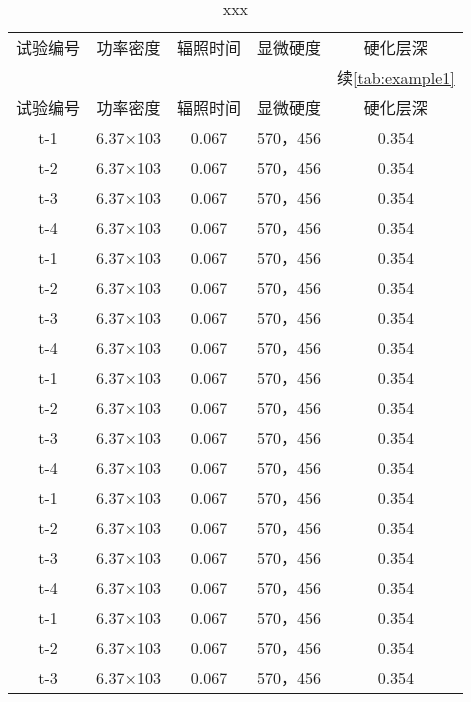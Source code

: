 
\begin{longtable}{ccccc}
\label{tab:example1} \\
\caption{xxx} \\
\toprule
试验编号 & 功率密度 & 辐照时间 & 显微硬度       & 硬化层深\\ 
\midrule
\endfirsthead


&&&& 续\autoref{tab:example1}\\
\hline
试验编号 & 功率密度 & 辐照时间 & 显微硬度       & 硬化层深\\ 
\midrule
\endhead

\hline
\endfoot
\bottomrule
\endlastfoot
t-1     &6.37×103       &0.067  &570，456        &0.354\\
t-2     &6.37×103       &0.067  &570，456        &0.354\\
t-3     &6.37×103       &0.067  &570，456        &0.354\\
t-4     &6.37×103       &0.067  &570，456        &0.354\\
t-1     &6.37×103       &0.067  &570，456        &0.354\\
t-2     &6.37×103       &0.067  &570，456        &0.354\\
t-3     &6.37×103       &0.067  &570，456        &0.354\\
t-4     &6.37×103       &0.067  &570，456        &0.354\\
t-1     &6.37×103       &0.067  &570，456        &0.354\\
t-2     &6.37×103       &0.067  &570，456        &0.354\\
t-3     &6.37×103       &0.067  &570，456        &0.354\\
t-4     &6.37×103       &0.067  &570，456        &0.354\\
t-1     &6.37×103       &0.067  &570，456        &0.354\\
t-2     &6.37×103       &0.067  &570，456        &0.354\\
t-3     &6.37×103       &0.067  &570，456        &0.354\\
t-4     &6.37×103       &0.067  &570，456        &0.354\\
t-1     &6.37×103       &0.067  &570，456        &0.354\\
t-2     &6.37×103       &0.067  &570，456        &0.354\\
t-3     &6.37×103       &0.067  &570，456        &0.354\\

\end{longtable}
